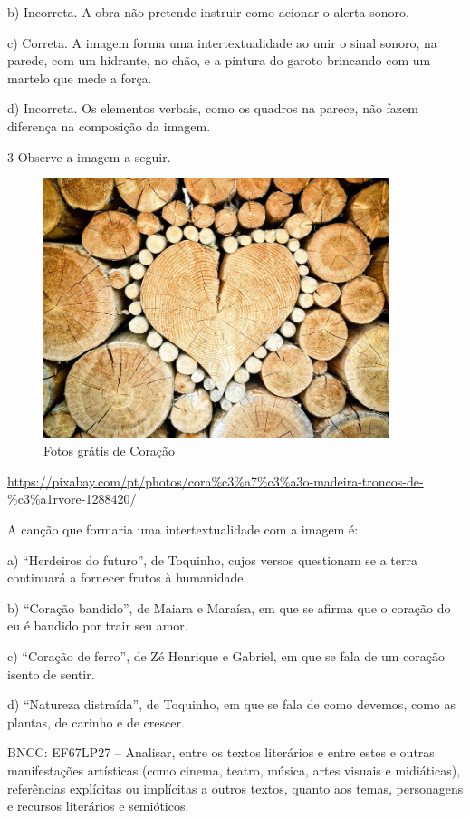 b) Incorreta. A obra não pretende instruir como acionar o alerta sonoro.

c) Correta. A imagem forma uma intertextualidade ao unir o sinal sonoro,
na parede, com um hidrante, no chão, e a pintura do garoto brincando com
um martelo que mede a força.

d) Incorreta. Os elementos verbais, como os quadros na parece, não fazem
diferença na composição da imagem.

\num{3} Observe a imagem a seguir.

\begin{figure}
\centering
\includegraphics[width=3.97917in,height=2.98438in]{./imgSAEB_6_POR/media/image14.jpeg}
\caption{Fotos grátis de Coração}
\end{figure}

\url{https://pixabay.com/pt/photos/cora\%c3\%a7\%c3\%a3o-madeira-troncos-de-\%c3\%a1rvore-1288420/}

A canção que formaria uma intertextualidade com a imagem é:

a) ``Herdeiros do futuro'', de Toquinho, cujos versos questionam se a
terra continuará a fornecer frutos à humanidade.

b) ``Coração bandido'', de Maiara e Maraísa, em que se afirma que o
coração do eu é bandido por trair seu amor.

c) ``Coração de ferro'', de Zé Henrique e Gabriel, em que se fala de um
coração isento de sentir.

d) ``Natureza distraída'', de Toquinho, em que se fala de como devemos,
como as plantas, de carinho e de crescer.

BNCC: EF67LP27 -- Analisar, entre os textos literários e entre estes e
outras manifestações artísticas (como cinema, teatro, música, artes
visuais e midiáticas), referências explícitas ou implícitas a outros
textos, quanto aos temas, personagens e recursos literários e
semióticos.

